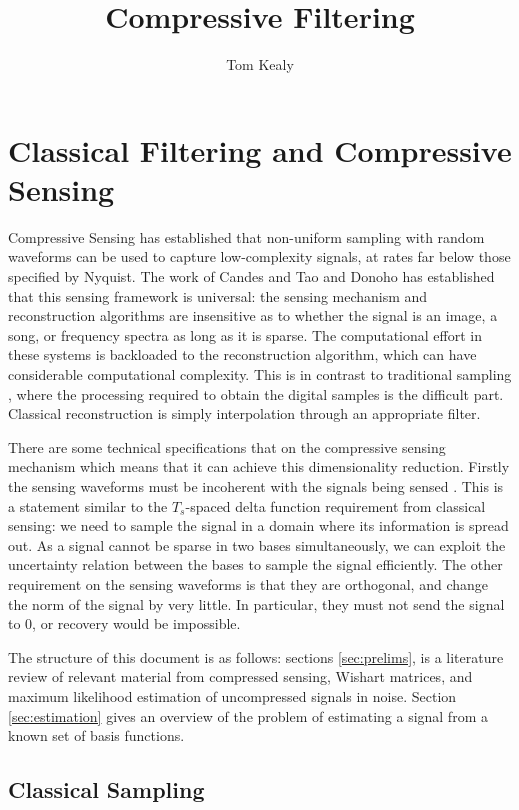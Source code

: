 \documentclass{article}
\title{Compressive Filtering}
\author{Tom Kealy}
\begin{document}
\maketitle

\section{Classical Filtering and Compressive Sensing}

Compressive Sensing has established that non-uniform sampling with random waveforms can be used to capture low-complexity signals, at rates far below those specified by Nyquist. The work of Candes and Tao \cite{Candes2006} and Donoho \cite{donoho2006compressed} has established that this sensing framework is universal: the sensing mechanism and reconstruction algorithms are insensitive as to whether the signal is an image, a song, or frequency spectra as long as it is sparse. The computational effort in these systems is backloaded to the reconstruction algorithm, which can have considerable computational complexity. This is in contrast to traditional sampling \cite{unser}, where the processing required to obtain the digital samples is the difficult part. Classical reconstruction is simply interpolation through an appropriate filter.

There are some technical specifications that on the compressive sensing mechanism which means that it can achieve this dimensionality reduction. Firstly the sensing waveforms must be incoherent with the signals being sensed \cite{candes2008introduction}. This is a statement similar to the \(T_s\)-spaced delta function requirement from classical sensing: we need to sample the signal in a domain where its information is spread out. As a signal cannot be sparse in two bases simultaneously, we can exploit the uncertainty relation between the bases to sample the signal efficiently. The other requirement on the sensing waveforms is that they are orthogonal, and change the norm of the signal by very little. In particular, they must not send the signal to \(0\), or recovery would be impossible.

The structure of this document is as follows: sections \eqref{sec:prelims}, is a literature review of relevant material from compressed sensing, Wishart matrices, and maximum likelihood estimation of uncompressed signals in noise. Section \eqref{sec:estimation} gives an overview of the problem of estimating a signal from a known set of basis functions. 

\subsection{Classical Sampling}
\end{document}
